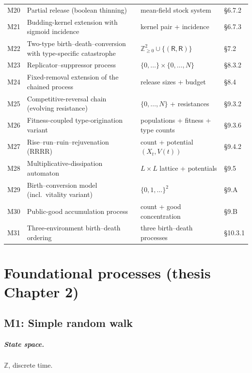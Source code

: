 \documentclass[11pt,a4paper]{report}
\newcommand{\R}{\mathsf{R}}
\newcommand{\Xt}{X_t}
\newcommand{\source}[1]{\par\noindent{\small\textit{Specified in #1.}}\par\medskip}
\begin{document}
{\begin{longtable}{@{}p{}p{}p{}p{}@{}}
M20 & Partial release (boolean thinning) & mean-field stock system & \S6.7.2 \\
M21 & Budding-kernel extension with sigmoid incidence & kernel pair + incidence & \S6.7.3 \\
M22 & Two-type birth--death--conversion with type-specific catastrophe & $\mathbb{Z}_{\ge0}^2\cup\{(\R,\R)\}$ & \S7.2 \\
M23 & Replicator--suppressor process & $\{0,\ldots\}\times\{0,\ldots,N\}$ & \S8.3.2 \\
M24 & Fixed-removal extension of the chained process & release sizes + budget & \S8.4 \\
M25 & Competitive-reversal chain (evolving resistance) & $\{0,\ldots,N\}$ + resistances & \S9.3.2 \\
M26 & Fitness-coupled type-origination variant & populations + fitness + type counts & \S9.3.6 \\
M27 & Rise--run--ruin--rejuvenation (RRRR) & count + potential $(\Xt,V(t))$ & \S9.4.2 \\
M28 & Multiplicative-dissipation automaton & $L\times L$ lattice + potentials & \S9.5 \\
M29 & Birth--conversion model (incl.\ vitality variant) & $\{0,1,\ldots\}^2$ & \S9.A \\
M30 & Public-good accumulation process & count + good concentration & \S9.B \\
M31 & Three-environment birth--death ordering & three birth--death processes & \S10.3.1 \\
\bottomrule
\end{longtable}
}

\chapter{Foundational processes (thesis Chapter 2)}

\section{M1: Simple random walk}
\source{\S2.2.1.1}

\paragraph{State space.} $\mathbb{Z}$, discrete time.
\end{document}
